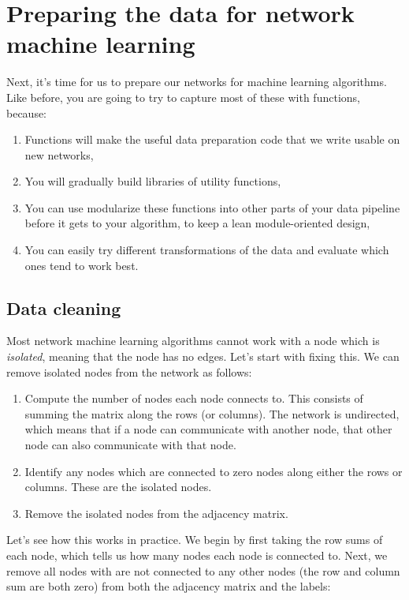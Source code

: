\section{Preparing the data for network machine learning}
\label{sec:ch2:prepare}
Next, it's time for us to prepare our networks for machine learning algorithms. Like before, you are going to try to capture most of these with functions, because:

\begin{enumerate}
    \item Functions will make the useful data preparation code that we write usable on new networks,
    \item You will gradually build libraries of utility functions,
    \item You can use modularize these functions into other parts of your data pipeline before it gets to your algorithm, to keep a lean module-oriented design,
    \item You can easily try different transformations of the data and evaluate which ones tend to work best.
\end{enumerate}

\subsection{Data cleaning}

Most network machine learning algorithms cannot work with a node which is \emph{isolated}, meaning that the node has no edges. Let's start with fixing this. We can remove isolated nodes from the network as follows:
\begin{enumerate}
\item Compute the number of nodes each node connects to. This consists of summing the matrix along the rows (or columns). The network is undirected, which means that if a node can communicate with another node, that other node can also communicate with that node.
\item Identify any nodes which are connected to zero nodes along either the rows or columns. These are the isolated nodes.
\item Remove the isolated nodes from the adjacency matrix.
\end{enumerate}

Let's see how this works in practice. We begin by first taking the row sums of each node, which tells us how many nodes each node is connected to. Next, we remove all nodes with are not connected to any other nodes (the row and column sum are both zero) from both the adjacency matrix and the labels:

